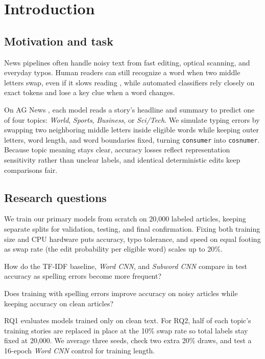 \chapter{Introduction}\label{ch:introduction}

\section{Motivation and task}
News pipelines often handle noisy text from fast editing, optical scanning, and everyday typos. Human readers can still recognize a word when two middle letters swap, even if it slows reading \citep{rayner2006}, while automated classifiers rely closely on exact tokens and lose a key clue when a word changes.

On AG News \citep{zhang2015,agmirror}, each model reads a story's headline and summary to predict one of four topics: \emph{World}, \emph{Sports}, \emph{Business}, or \emph{Sci/Tech}. We simulate typing errors by swapping two neighboring middle letters inside eligible words while keeping outer letters, word length, and word boundaries fixed, turning \texttt{consumer} into \texttt{cosnumer}. Because topic meaning stays clear, accuracy losses reflect representation sensitivity rather than unclear labels, and identical deterministic edits keep comparisons fair.

\section{Research questions}
We train our primary models from scratch on 20,000 labeled articles, keeping separate splits for validation, testing, and final confirmation. Fixing both training size and CPU hardware puts accuracy, typo tolerance, and speed on equal footing as swap rate (the edit probability per eligible word) scales up to 20\%.

\begin{description}
\setlength{\itemsep}{2pt}\setlength{\parskip}{2pt}
\item[RQ1.] How do the TF-IDF baseline, \textit{Word CNN}, and \textit{Subword CNN} compare in test accuracy as spelling errors become more frequent?
\item[RQ2.] Does training with spelling errors improve accuracy on noisy articles while keeping accuracy on clean articles?
\end{description}

RQ1 evaluates models trained only on clean text. For RQ2, half of each topic's training stories are replaced in place at the 10\% swap rate so total labels stay fixed at 20,000. We average three seeds, check two extra 20\% draws, and test a 16-epoch \textit{Word CNN} control for training length.

